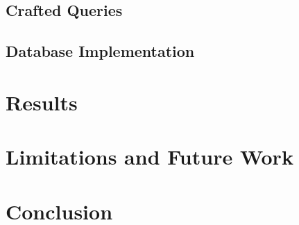 \documentclass[conference,11pt]{IEEEtran}
\begin{document}
\subsection{Crafted Queries}
\subsection{Database Implementation}

\section{Results}

\section{Limitations and Future Work}

\section{Conclusion}

\printbibliography
\end{document}
